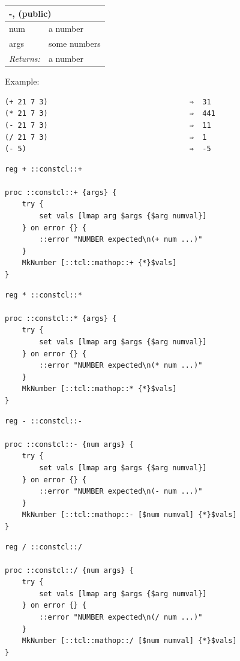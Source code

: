 \documentclass[twoside,9pt]{report}
\begin{document}
\begin{tabular}{ |l l| }
\hline
\multicolumn{2}{|l|}{-,  (public)} \\
\hline
num & a number \\
args & some numbers \\
\textit{Returns:} & a number \\
\hline
\end{tabular}


Example:

\noindent\makebox[\linewidth]{\rule{\linewidth}{0.4pt}}
\begin{lstlisting}
(+ 21 7 3)                                 ⇒  31
(* 21 7 3)                                 ⇒  441
(- 21 7 3)                                 ⇒  11
(/ 21 7 3)                                 ⇒  1
(- 5)                                      ⇒  -5
\end{lstlisting}
\noindent\makebox[\linewidth]{\rule{\linewidth}{0.4pt}}
\noindent\makebox[\linewidth]{\rule{\linewidth}{0.4pt}}
\begin{lstlisting}
reg + ::constcl::+
 
proc ::constcl::+ {args} {
    try {
        set vals [lmap arg $args {$arg numval}]
    } on error {} {
        ::error "NUMBER expected\n(+ num ...)"
    }
    MkNumber [::tcl::mathop::+ {*}$vals]
}
\end{lstlisting}
\noindent\makebox[\linewidth]{\rule{\linewidth}{0.4pt}}
\noindent\makebox[\linewidth]{\rule{\linewidth}{0.4pt}}
\begin{lstlisting}
reg * ::constcl::*
 
proc ::constcl::* {args} {
    try {
        set vals [lmap arg $args {$arg numval}]
    } on error {} {
        ::error "NUMBER expected\n(* num ...)"
    }
    MkNumber [::tcl::mathop::* {*}$vals]
}
\end{lstlisting}
\noindent\makebox[\linewidth]{\rule{\linewidth}{0.4pt}}
\noindent\makebox[\linewidth]{\rule{\linewidth}{0.4pt}}
\begin{lstlisting}
reg - ::constcl::-
 
proc ::constcl::- {num args} {
    try {
        set vals [lmap arg $args {$arg numval}]
    } on error {} {
        ::error "NUMBER expected\n(- num ...)"
    }
    MkNumber [::tcl::mathop::- [$num numval] {*}$vals]
}
\end{lstlisting}
\noindent\makebox[\linewidth]{\rule{\linewidth}{0.4pt}}
\noindent\makebox[\linewidth]{\rule{\linewidth}{0.4pt}}
\begin{lstlisting}
reg / ::constcl::/
 
proc ::constcl::/ {num args} {
    try {
        set vals [lmap arg $args {$arg numval}]
    } on error {} {
        ::error "NUMBER expected\n(/ num ...)"
    }
    MkNumber [::tcl::mathop::/ [$num numval] {*}$vals]
}
\end{lstlisting}
\noindent\makebox[\linewidth]{\rule{\linewidth}{0.4pt}}
\end{document}
